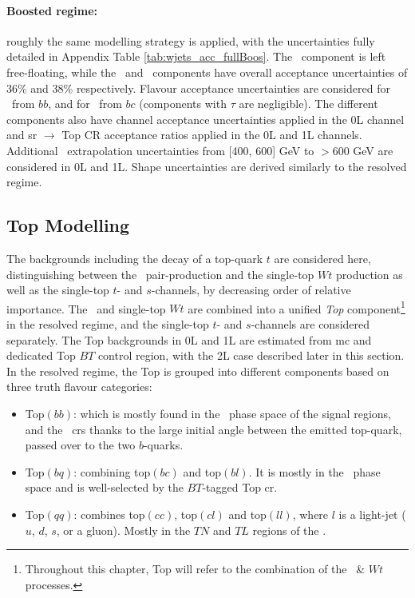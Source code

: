 \paragraph{Boosted regime:} roughly the same modelling strategy is applied, with the uncertainties fully detailed in Appendix Table \ref{tab:wjets_acc_fullBoos}. The \whf\ component is left free-floating, while the \wmf\ and \wlf\ components have overall acceptance uncertainties of 36\% and 38\% respectively. Flavour acceptance uncertainties are considered for \whf\ from $bb$, and for \wmf\ from $bc$ (components with $\tau$ are negligible). The different components also have channel acceptance uncertainties applied in the 0L channel and \gls{sr} $\rightarrow$ Top CR acceptance ratios applied in the 0L and 1L channels. Additional \ptv\ extrapolation uncertainties from [400, 600] GeV to $> 600$ GeV are considered in 0L and 1L. Shape uncertainties are derived similarly to the resolved regime. 

\subsection{Top Modelling}\label{sec-modTop} 
The backgrounds including the decay of a top-quark $t$ are considered here, distinguishing between the \ttb\ pair-production and the single-top $Wt$ production as well as the single-top $t$- and $s$-channels, by decreasing order of relative importance. The \ttb\ and single-top $Wt$ are combined into a unified \textit{Top} component\footnote{Throughout this chapter, Top will refer to the combination of the \ttb\ \& $Wt$ processes.} in the resolved regime, and the single-top $t$- and $s$-channels are considered separately. The Top backgrounds in 0L and 1L are estimated from \gls{mc} and dedicated Top $BT$ control region, with the 2L case described later in this section. In the resolved regime, the Top is grouped into different components based on three truth flavour categories:
\begin{itemize}
    \item Top$(bb)$: which is mostly found in the \vhb\ phase space of the signal regions, and the \highdr\ \gls{cr}s thanks to the large initial angle between the emitted top-quark, passed over to the two $b$-quarks. 
    \item Top$(bq)$: combining top$(bc)$ and top$(bl)$. It is mostly in the \vhc\ phase space and is well-selected by the $BT$-tagged Top \gls{cr}.
    \item Top$(qq)$: combines top$(cc)$, top$(cl)$ and top$(ll)$, where $l$ is a light-jet ($u$, $d$, $s$, or a gluon). Mostly in the $TN$ and $TL$ regions of the \vhc. 
\end{itemize}

